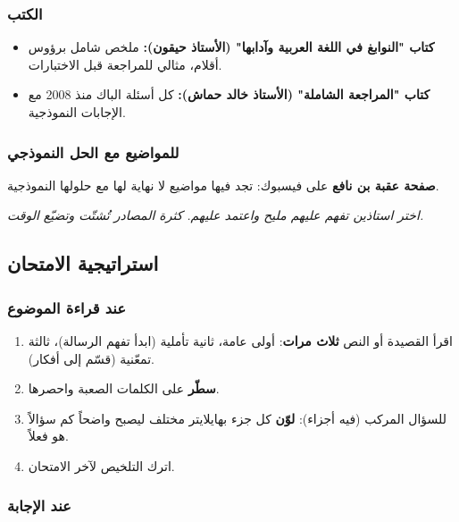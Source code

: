 \documentclass[12pt,a4paper]{book}
\newcommand{\quoteAr}[1]{%
	\begin{myquote}
		\itshape #1
	\end{myquote}
}
\begin{document}
	\subsubsection*{الكتب}
	
	\begin{itemize}
		\item \textbf{كتاب "النوابغ في اللغة العربية وآدابها" (الأستاذ حيقون):} ملخص شامل برؤوس أقلام، مثالي للمراجعة قبل الاختبارات.
		\item \textbf{كتاب "المراجعة الشاملة" (الأستاذ خالد حماش):} كل أسئلة الباك منذ 2008 مع الإجابات النموذجية.
	\end{itemize}
	
	\subsubsection*{للمواضيع مع الحل النموذجي}
	
	\textbf{صفحة عقبة بن نافع} على فيسبوك: تجد فيها مواضيع لا نهاية لها مع حلولها النموذجية.
	
	\quoteAr{اختر استاذين تفهم عليهم مليح واعتمد عليهم. كثرة المصادر تُشتّت وتضيّع الوقت.}
	
	\subsection{استراتيجية الامتحان}
	
	\subsubsection*{عند قراءة الموضوع}
	
	\begin{enumerate}
		\item اقرأ القصيدة أو النص \textbf{ثلاث مرات}: أولى عامة، ثانية تأملية (ابدأ تفهم الرسالة)، ثالثة تمعّنية (قسّم إلى أفكار).
		\item \textbf{سطّر} على الكلمات الصعبة واحصرها.
		\item للسؤال المركب (فيه أجزاء): \textbf{لوّن} كل جزء بهايلايتر مختلف ليصبح واضحاً كم سؤالاً هو فعلاً.
		\item اترك التلخيص لآخر الامتحان.
	\end{enumerate}
	
	\subsubsection*{عند الإجابة}
	
\end{document}
